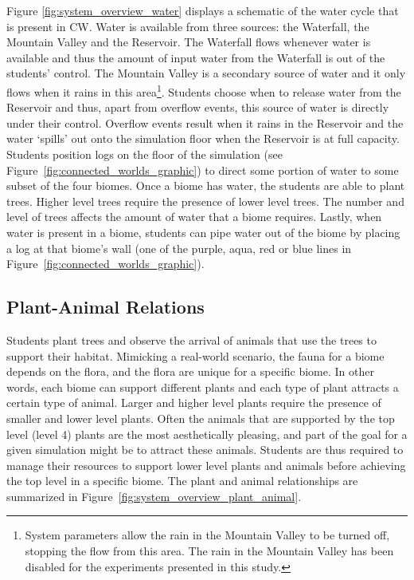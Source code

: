 Figure \ref{fig:system_overview_water} displays a schematic of the water cycle that is present in CW. Water is available from three sources: the Waterfall, the Mountain Valley and the Reservoir. The Waterfall flows whenever water is available and thus the amount of input water from the Waterfall is out of the students' control. The Mountain Valley is a secondary source of water and it only flows when it rains in this area\footnote{System parameters allow the rain in the Mountain Valley to be turned off, stopping the flow from this area. The rain in the Mountain Valley has been disabled for the experiments presented in this study.}. Students choose when to release water from the Reservoir and thus, apart from overflow events, this source of water is directly under their control. Overflow events result when it rains in the Reservoir and the water `spills' out onto the simulation floor when the Reservoir is at full capacity. Students position logs on the floor of the simulation (see Figure~\ref{fig:connected_worlds_graphic}) to direct some portion of water to some subset of the four biomes. Once a biome has water, the students are able to plant trees. Higher level trees require the presence of lower level trees. The number and level of trees affects the amount of water that a biome requires. Lastly, when water is present in a biome, students can pipe water out of the biome by placing a log at that biome's wall (one of the purple, aqua, red or blue lines in Figure~\ref{fig:connected_worlds_graphic}).



\subsection{Plant-Animal Relations}

Students plant trees and observe the arrival of animals that use the trees to support their habitat. Mimicking a real-world scenario, the fauna for a biome depends on the flora, and the flora are unique for a specific biome. In other words, each biome can support different plants and each type of plant attracts a certain type of animal. Larger and higher level plants require the presence of smaller and lower level plants. Often the animals that are supported by the top level (level 4) plants are the most aesthetically pleasing, and part of the goal for a given simulation might be to attract these animals. Students are thus required to manage their resources to support lower level plants and animals before achieving the top level in a specific biome. The plant and animal relationships are summarized in Figure~\ref{fig:system_overview_plant_animal}.

